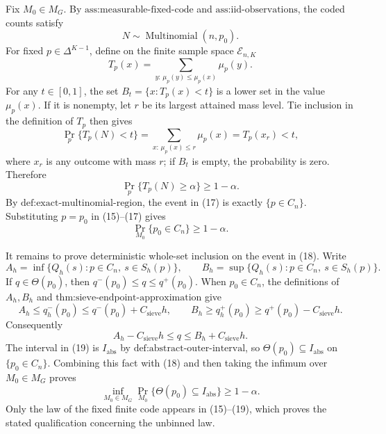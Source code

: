 Fix \(M_0\in M_G\).  By \(\text{ass:measurable-fixed-code}\) and \(\text{ass:iid-observations}\), the coded counts satisfy
\[
N\sim\operatorname{Multinomial}(n,p_0).                           \tag{15}
\]
For fixed \(p\in\Delta^{K-1}\), define on the finite sample space \(\mathcal E_{n,K}\)
\[
T_p(x)=\sum_{y:\,\mu_p(y)\leq\mu_p(x)}\mu_p(y).
\]
For any \(t\in[0,1]\), the set \(B_t=\{x:T_p(x)<t\}\) is a lower set in the value \(\mu_p(x)\).  If it is nonempty, let \(r\) be its largest attained mass level.  Tie inclusion in the definition of \(T_p\) then gives
\[
\Pr_p\{T_p(N)<t\}=\sum_{x:\,\mu_p(x)\leq r}\mu_p(x)=T_p(x_r)<t, \tag{16}
\]
where \(x_r\) is any outcome with mass \(r\); if \(B_t\) is empty, the probability is zero.  Therefore
\[
\Pr_p\{T_p(N)\geq\alpha\}\geq1-\alpha.                         \tag{17}
\]
By \(\text{def:exact-multinomial-region}\), the event in (17) is exactly \(\{p\in C_n\}\).  Substituting \(p=p_0\) in (15)--(17) gives
\[
\Pr_{M_0}\{p_0\in C_n\}\geq1-\alpha.                         \tag{18}
\]

It remains to prove deterministic whole-set inclusion on the event in (18).  Write
\[
A_h=\inf\{Q_h(s):p\in C_n,\ s\in S_h(p)\},\qquad
B_h=\sup\{Q_h(s):p\in C_n,\ s\in S_h(p)\}.
\]
If \(q\in\Theta(p_0)\), then \(q^-(p_0)\leq q\leq q^+(p_0)\).  When \(p_0\in C_n\), the definitions of \(A_h,B_h\) and \(\text{thm:sieve-endpoint-approximation}\) give
\[
A_h\leq q_h^-(p_0)\leq q^-(p_0)+C_{\mathrm{sieve}}h,
\qquad
B_h\geq q_h^+(p_0)\geq q^+(p_0)-C_{\mathrm{sieve}}h.
\]
Consequently
\[
A_h-C_{\mathrm{sieve}}h\leq q\leq B_h+C_{\mathrm{sieve}}h.      \tag{19}
\]
The interval in (19) is \(I_{\mathrm{abs}}\) by \(\text{def:abstract-outer-interval}\), so \(\Theta(p_0)\subseteq I_{\mathrm{abs}}\) on \(\{p_0\in C_n\}\).  Combining this fact with (18) and then taking the infimum over \(M_0\in M_G\) proves
\[
\inf_{M_0\in M_G}\Pr_{M_0}\{\Theta(p_0)\subseteq I_{\mathrm{abs}}\}\geq1-\alpha.
\]
Only the law of the fixed finite code appears in (15)--(19), which proves the stated qualification concerning the unbinned law.

